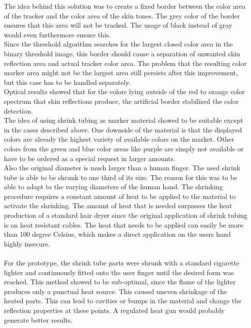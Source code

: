 The idea behind this solution was to create a fixed border between the color area of the tracker and the color area of the skin tones. The grey color of the border ensures that this area will not be tracked. The usage of black instead of gray would even furthermore ensure this. 
\\Since the threshold algorithm searches for the largest closed color area in the binary threshold image, this border should cause a separation of unwanted skin reflection area and actual tracker color area. The problem that the resulting color marker area might not be the largest area still persists after this improvement, but this case has to be handled separately.
\\Optical results showed that for the colors lying outside of the red to orange color spectrum that skin reflections produce, the artificial border stabilized the color detection.
\\The idea of using shrink tubing as marker material showed to be suitable except in the cases described above. One downside of the material is that the displayed colors are already the highest variety of available colors on the market. Other colors from the green and blue color areas like purple are simply not available or have to be ordered as a special request in larger amounts.
\\Also the original diameter is much larger than a human finger. The used shrink tube is able to be shrunk to one third of its size. The reason for this was to be able to adapt to the varying diameters of the human hand. The shrinking procedure requires a constant amount of heat to be applied to the material to activate the shrinking. The amount of heat that is needed surpasses the heat production of a standard hair dryer since the original application of shrink tubing is on heat resistant cables. The heat that needs to be applied can easily be more than 100 degree Celsius, which makes a direct application on the users hand highly insecure.
\\\\For the prototype, the shrink tube parts were shrunk with a standard cigarette lighter and continuously fitted onto the user finger until the desired form was reached. This method showed to  be sub-optimal, since the flame of the lighter produces only a punctual heat source. This caused uneven shrinkage of the heated parts. This can lead to cavities or bumps in the material and change the reflection properties at these points. A regulated heat gun would probably generate better results.
